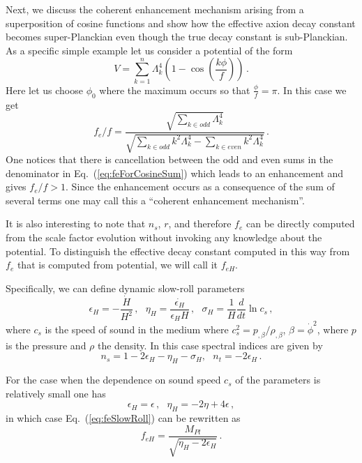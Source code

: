 \documentclass[12pt]{article}
\begin{document}
Next, we discuss the coherent enhancement mechanism arising from a superposition of cosine functions and show how the effective axion decay constant becomes super-Planckian even though the true decay constant is sub-Planckian.
As a specific simple example let us consider a potential of the form
\begin{equation} \label{eq:cosineSumPotential}
  V = \sum_{k = 1}^n \Lambda_k^4 \left(1 - \cos\left(\frac{k\phi}{f}\right)\right)\,.
\end{equation}
Here let us choose $\phi_0$ where the maximum occurs so that $\frac{\phi}{f} = \pi$.
In this case we get
\begin{equation} \label{eq:feForCosineSum}
  {f_e} / f = \frac
    {\sqrt{\sum_{k \in odd} \Lambda_k^4}}
    {\sqrt{\sum_{k \in odd} k^2 \Lambda_k^4 - \sum_{k \in even} k^2 \Lambda_k^4}}\,.
\end{equation}
One notices that there is cancellation between the odd and even sums in the denominator in Eq.~(\ref{eq:feForCosineSum}) which leads to an enhancement and gives $f_e / f > 1$.
Since the enhancement occurs as a consequence of the sum of several terms one may call this a ``coherent enhancement mechanism''.

It is also interesting to note that $n_s$, $r$, and therefore $f_e$ can be directly computed from the scale factor evolution without invoking any knowledge about the potential.
To distinguish the effective decay constant computed in this way from $f_e$ that is computed from potential, we will call it $f_{eH}$.

Specifically, we can define dynamic slow-roll parameters
\begin{equation} \label{eq:slowRollParametersDynamic}
  \epsilon_H = -\frac{\dot H}{H^2}\,,
  ~~~ \eta_H = \frac{\dot{\epsilon_H}}{\epsilon_H H}\,,
  ~~~ \sigma_H = \frac{1}{H} \frac{d}{dt} \ln c_s\,,
\end{equation}
where $c_s$ is the speed of sound in the medium where $c_s^2 = p_{,\beta} / \rho_{,\beta}$, $\beta = \dot\phi^2$, where $p$ is the pressure and $\rho$ the density.
In this case spectral indices are given by~\cite{Garriga:1999vw, Spalinski:2007qy}
\begin{equation}
      n_s = 1 - 2 \epsilon_H - \eta_H - \sigma_H,
  ~~~ n_t = - 2\epsilon_H\,.
\end{equation}

For the case when the dependence on sound speed $c_s$ of the parameters is relatively small one has
\begin{equation} \label{eq:slowRollParametersDynamicFromStatic}
  \epsilon_H = \epsilon\,,
  ~~~ \eta_H = -2 \eta + 4 \epsilon\,,
\end{equation}
in which case Eq.~(\ref{eq:feSlowRoll}) can be rewritten as
\begin{equation} \label{eq:feFromDynamicSlowRollParameters}
  f_{eH} = \frac{M_{Pl}}{\sqrt{\eta_H - 2 \epsilon_H}}\,.
\end{equation}
\end{document}
